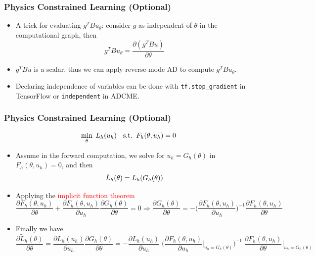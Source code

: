 \documentclass{beamer}
\begin{document}
\begin{frame}
	\frametitle{Physics Constrained Learning (Optional)}
	
	\begin{itemize}
		\item A trick for evaluating $g^T Bu_\theta$: consider $g$ as independent of $\theta$ in the computational graph, then 
		$$g^T Bu_\theta = \frac{\partial (g^T Bu)}{\partial \theta}$$
		\item $g^T Bu$ is a scalar, thus we can apply reverse-mode AD to compute $g^T Bu_\theta$.
		\item Declaring independence of variables can be done with \texttt{tf.stop\_gradient} in TensorFlow or \texttt{independent} in ADCME. 
	\end{itemize}
\end{frame}


\begin{frame}
	\frametitle{Physics Constrained Learning (Optional)}
	 $${\small    \min_{\theta}\; L_h(u_h) \quad \mathrm{s.t.}\;\; F_h(\theta, u_h) = 0}$$
	\begin{itemize}
\item Assume in the forward computation, we solve for $u_h=G_h(\theta)$ in $F_h(\theta, u_h)=0$, and then
$${\small\tilde L_h(\theta)  = L_h(G_h(\theta))}$$
\item Applying the \textcolor{red}{implicit function theorem}
{  \scriptsize
\begin{equation*}
\frac{{\partial {F_h(\theta, u_h)}}}{{\partial \theta }} + {\frac{{\partial {F_h(\theta, u_h)}}}{{\partial {u_h}}}}  \frac{\partial G_h(\theta)}{\partial \theta} = 0  \Rightarrow 
     \frac{\partial G_h(\theta)}{\partial \theta} =  -\Big( \frac{{\partial {F_h(\theta, u_h)}}}{{\partial {u_h}}} \Big)^{ - 1} \frac{{\partial {F_h(\theta, u_h)}}}{{\partial \theta }}
\end{equation*}
}
\item Finally we have
{\scriptsize
\begin{equation*}
    \boxed{\frac{{\partial {{\tilde L}_h}(\theta )}}{{\partial \theta }} 
    = \frac{\partial {{ L}_h}(u_h )}{\partial u_h}\frac{\partial G_h(\theta)}{\partial \theta}= - \frac{{\partial {L_h}({u_h})}}{{\partial {u_h}}} \;
    \Big( {\frac{{\partial {F_h(\theta, u_h)}}}{{\partial {u_h}}}\Big|_{u_h = {G_h}(\theta )}} \Big)^{ - 1} \;
    \frac{{\partial {F_h(\theta, u_h)}}}{{\partial \theta }}\Big|_{u_h = {G_h}(\theta )}}
\end{equation*}
}

	\end{itemize}
	
\end{frame}
\end{document}
